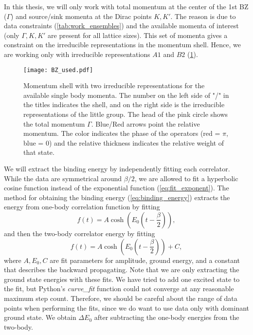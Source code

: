 In this thesis, we will only work with total momentum at the center of the 1st BZ ($\Gamma$) and source/sink momenta at the Dirac points $K, K'$. The reason is due to data constraints (\cref{tab:work_ensembles}) and the available momenta of interest (only $\Gamma, K, K'$ are present for all lattice sizes). This set of momenta gives a constraint on the irreducible representations in the momentum shell. Hence, we are working only with irreducible representations $A1$ and $B2$ (\cref{fig:used_irrep}).
\begin{figure}[!htbp]
  \centerline{\texttt{[image: BZ\_used.pdf]}}
  \caption{Momentum shell with two irreducible representations for the available single body momenta. The number on the left side of "/" in the titles indicates the shell, and on the right side is the irreducible representations of the little group. The head of the pink circle shows the total momentum $\Gamma$. Blue/Red arrows point the relative momentum. The color indicates the phase of the operators (red = $\pi$, blue = 0) and the relative thickness indicates the relative weight of that state.}
  \label{fig:used_irrep}
\end{figure}

We will extract the binding energy by independently fitting each correlator. While the data are symmetrical around $\beta/2$, we are allowed to fit a hyperbolic cosine function instead of the exponential function (\cref{eq:fit_exponent}). The method for obtaining the binding energy (\cref{eq:binding_energy}) extracts the energy from one-body correlation function by fitting
\begin{equation}
    f(t) = A\cosh\left(E_0\left(t-\frac{\beta}{2}\right)\right),
    \label{eq:cosh1}
\end{equation}
and then the two-body correlator energy by fitting
\begin{equation}
  f(t) = A\cosh\left(E_0\left(t-\frac{\beta}{2}\right)\right) + C,
    \label{eq:cosh2}
\end{equation}
where $A, E_0, C$ are fit parameters for amplitude, ground energy, and a constant that describes the backward propagating. Note that we are only extracting the ground state energies with these fits. We have tried to add one excited state to the fit, but Python's \textit{curve\_fit} function could not converge at any reasonable maximum step count. Therefore, we should be careful about the range of data points when performing the fits, since we do want to use data only with dominant ground state. We obtain $\Delta E_0$ after subtracting the one-body energies from the two-body.

